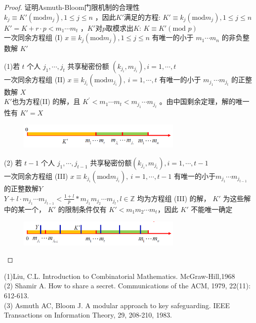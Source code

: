 \documentclass[12pt, a4paper, oneside]{ctexbook}
\begin{document}
\begin{proof}{证明Asmuth-Bloom门限机制的合理性}\\
    $k_j\equiv K'({\mathrm{mod}}m_j),1\leq j\leq n$ ，因此$K'$满足的方程: $K'\equiv k_j({\mathrm{mod}}m_j),1\leq j\leq n$\\
    $K'=K+r\cdot p<m_1\cdots m_t$ ，$K'$对$p$取模求出$K$: $K\equiv K'(\text{mod }p)$\\
    一次同余方程组 (I) $x\equiv k_j\left({\mathrm{mod}}m_j\right),1\leq j\leq n$ 有唯一的小于 $m_1\cdots m_n$ 的非负整数解 $K'$\par
    (1)若 $t$ 个人 $j_1,\cdots,j_t$ 共享秘密份额 $\left(k_{j_i},m_{j_i}\right),i=1,\cdots,t$\\
    一次同余方程组 (II) $x\equiv k_{j_i}({\mathrm{mod}}m_{j_i}),\:i=1,\cdots,t$ 有唯一的小于 $m_{j_1}\cdots m_{j_t}$ 的正整数解 $X$\\
    $K'$也为方程(II) 的解，且 $K^{\prime}<m_1\cdots m_t<m_{j_1}\cdots m_{j_t}$ 。由中国剩余定理，解的唯一性有 $K'= X$ 
    \begin{figure}[H]
        \centering
        \includegraphics[width=8cm]{assets/方程ⅡK'值所在区间.png}
    \end{figure}
    (2) 若 $t-1$ 个人 $j_1,\cdots,j_{t-1}$ 共享秘密份额$\left(k_{j_i},m_{j_i}\right),i=1,\cdots,t-1$\\
    一次同余方程组 (III) $x\equiv k_{j_i}({\mathrm{mod}}m_{j_i}),\:i=1,\cdots,t-1$ 有唯一的小于$m_{j_1}\cdots m_{j_{t-1}}$的正整数解$Y$\\
    $Y+l\cdot m_{j_1}\cdots m_{j_{t-1}} < \frac{1+l}{p}*m_{j_1}m_{j_2}\cdots m_{j_{t}},l\in\mathbb{Z}$ 均为方程组 (III) 的解，  $K'$ 为这些解中的某一个， $K'$ 的限制条件仅有 $K' < m_1 m_2\cdots m_t$，因此 $K'$ 不能唯一确定 
    \begin{figure}[H]
        \centering
        \includegraphics[width=8cm]{assets/方程ⅢK'值所在区间.png}
    \end{figure}
\end{proof}

\noindent(1)Liu, C.L. Introduction to Combinatorial Mathematics. McGraw-Hill,1968\\
(2) Shamir A. How to share a secret. Communications of the ACM, 1979, 22(11): 612-613.\\
(3) Asmuth AC, Bloom J. A modular approach to key safeguarding. IEEE Transactions on Information Theory, 29, 208-210, 1983.\\
\end{document}
